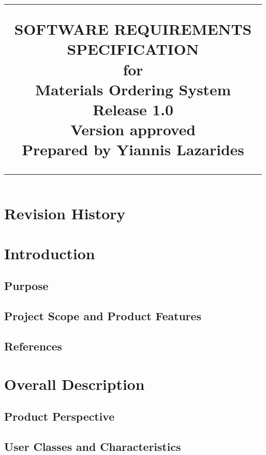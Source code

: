 \documentclass{scrreprt}
\title{%
\flushright
\rule{16cm}{5pt}\vskip1cm
\Huge{SOFTWARE REQUIREMENTS\\ SPECIFICATION}\\
\vspace{2cm}
for\\
\vspace{2cm}
Materials Ordering System\\
\vspace{2cm}
\LARGE{Release 1.0\\}
\vspace{2cm}
\LARGE{Version \myversion approved\\}
\vspace{2cm}
Prepared by Yiannis Lazarides\\
\vfill
\rule{16cm}{5pt}
}
\date{}
\begin{document}
\maketitle
\tableofcontents
\chapter*{Revision History}
\chapter{Introduction}
\section{Purpose}
\section{Project Scope and Product Features}
\section{References}
\chapter{Overall Description}
\section{Product Perspective}
\section{User Classes and Characteristics}
\end{document}

